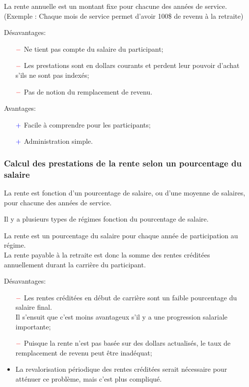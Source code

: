 \documentclass[10pt, french]{article}
\begin{document}
\begin{multicols*}{3}
\begin{definitionNOHFILL}
La rente annuelle est un montant fixe pour chacune des années de service. (Exemple : Chaque mois de service permet d'avoir 100\$ de revenu à la retraite)

Désavantages:
\begin{itemize}
	\item[$\color{red}-$]	Ne tient pas compte du salaire du participant;
	\item[$\color{red}-$]	Les prestations sont en dollars courants et perdent leur pouvoir d'achat s'ils ne sont pas indexés;
	\item[$\color{red}-$]	Pas de notion du remplacement de revenu.
\end{itemize}

Avantages:
\begin{itemize}
	\item[$\color{blue}+$]	Facile à comprendre pour les participants;
	\item[$\color{blue}+$]	Administration simple.
\end{itemize}
\end{definitionNOHFILL}

\subsubsection*{Calcul des prestations de la rente selon un pourcentage du salaire}

La rente est fonction d'un pourcentage de salaire, ou d'une moyenne de salaires, pour chacune des années de service.

Il y a plusieurs types de régimes fonction du pourcentage de salaire.

\begin{definitionNOHFILL}
La rente est un pourcentage du salaire pour chaque année de participation au régime. \\
La rente payable à la retraite est donc la somme des rentes créditées annuellement durant la carrière du participant.

Désavantages:
\begin{itemize}
	\item[$\color{red}-$]	Les rentes créditées en début de carrière sont un faible pourcentage du salaire final.\\
							Il s'ensuit que c'est moins avantageux s'il y a une progression salariale importante;
	\item[$\color{red}-$]	Puisque la rente n'est pas basée sur des dollars actualisés, le taux de remplacement de revenu peut être inadéquat;
	\item	La revalorisation périodique des rentes créditées serait nécessaire pour atténuer ce problème, mais c'est plus compliqué.
\end{itemize}


\end{definitionNOHFILL}
\end{multicols*}
\end{document}
